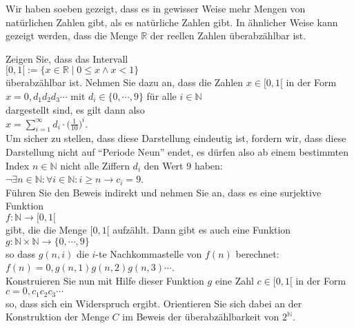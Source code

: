 \remark
Wir haben soeben gezeigt, dass es in gewisser Weise mehr Mengen von nat\"{u}rlichen Zahlen gibt, als es
nat\"{u}rliche Zahlen gibt.  In \"{a}hnlicher Weise kann gezeigt werden, dass die Menge $\mathbb{R}$ der reellen
Zahlen \"{u}berabz\"{a}hlbar ist.  

\exercise
Zeigen Sie, dass das Intervall
\\[0.2cm]
\hspace*{1.3cm}
$[0,1[ := \{ x \in \mathbb{R} \mid 0 \leq x \wedge x < 1 \}$ 
\\[0.2cm]
\"{u}berabz\"{a}hlbar ist.  Nehmen Sie dazu an, dass die Zahlen $x \in [0,1[$ in der Form
\\[0.2cm]
\hspace*{1.3cm}
$ x = 0, d_1 d_2 d_3 \cdots$ \quad mit $d_i \in \{ 0, \cdots, 9 \}$  f\"{u}r alle $i \in \mathbb{N}$
\\[0.2cm]
dargestellt sind, es gilt dann also
\\[0.2cm]
\hspace*{1.3cm}
$x = \sum\limits_{i=1}^\infty d_i \cdot \bigl(\frac{1}{10}\bigr)^{i}$.
\\[0.2cm]
Um sicher zu stellen, dass diese Darstellung eindeutig ist, fordern wir, dass diese Darstellung
nicht auf ``Periode Neun'' endet, es d\"{u}rfen also ab einem bestimmten Index $n \in \mathbb{N}$ nicht
alle Ziffern $d_i$ den Wert $9$ haben:
\\[0.2cm]
\hspace*{1.3cm}
$\neg \exists n \in \mathbb{N}: \forall i \in \mathbb{N}: i \geq n \rightarrow c_i = 9$.
\\[0.2cm]
F\"{u}hren Sie den Beweis indirekt und nehmen Sie an, dass es eine surjektive Funktion 
\\[0.2cm]
\hspace*{1.3cm}
$f: \mathbb{N} \rightarrow [0,1[$
\\[0.2cm]
gibt, die die Menge $[0,1[$ aufz\"{a}hlt.  Dann gibt es auch eine Funktion
\\[0.2cm]
\hspace*{1.3cm}
$g: \mathbb{N} \times \mathbb{N} \rightarrow \{0, \cdots, 9\}$
\\[0.2cm]
so dass $g(n,i)$ die $i$-te Nachkommastelle von $f(n)$ berechnet:
\\[0.2cm]
\hspace*{1.3cm}
$f(n) = 0,g(n,1) g(n,2) g(n,3) \cdots$.
\\[0.2cm]
Konstruieren Sie nun mit Hilfe dieser Funktion $g$ eine Zahl $c \in [0,1[$ in der Form
\\[0.2cm]
\hspace*{1.3cm}
$c = 0,c_1c_2c_3 \cdots$
\\[0.2cm]
so, dass sich ein Widerspruch ergibt.  Orientieren Sie sich dabei an der Konstruktion der Menge $C$ im
Beweis der \"{u}berabz\"{a}hlbarkeit von $2^\mathbb{N}$.  \exend

